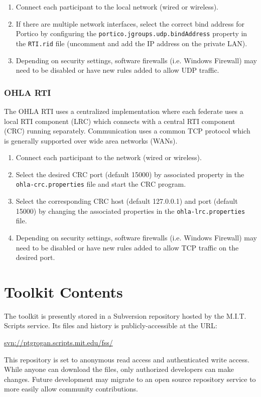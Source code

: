 \documentclass[]{article}
\begin{document}
\begin{enumerate}
\item Connect each participant to the local network (wired or wireless).
\item If there are multiple network interfaces, select the correct bind address for Portico by configuring the \texttt{portico.jgroups.udp.bindAddress} property in the \texttt{RTI.rid} file (uncomment and add the IP address on the private LAN).
\item Depending on security settings, software firewalls (i.e. Windows Firewall) may need to be disabled or have new rules added to allow UDP traffic.
\end{enumerate}

\subsubsection{OHLA RTI}

The OHLA RTI uses a centralized implementation where each federate uses a local RTI component (LRC) which connects with a central RTI component (CRC) running separately. Communication uses a common TCP protocol which is generally supported over wide area networks (WANs). 

\begin{enumerate}
\item Connect each participant to the network (wired or wireless).
\item Select the desired CRC port (default 15000) by associated property in the \texttt{ohla-crc.properties} file and start the CRC program.
\item Select the corresponding CRC host (default 127.0.0.1) and port (default 15000) by changing the associated properties in the \texttt{ohla-lrc.properties} file.
\item Depending on security settings, software firewalls (i.e. Windows Firewall) may need to be disabled or have new rules added to allow TCP traffic on the desired port.
\end{enumerate}

\section{Toolkit Contents}

The toolkit is presently stored in a Subversion repository hosted by the M.I.T. Scripts service. Its files and history is publicly-accessible at the URL:
\begin{center}
\url{svn://ptgrogan.scripts.mit.edu/fss/}
\end{center}
This repository is set to anonymous read access and authenticated write access. While anyone can download the files, only authorized developers can make changes. Future development may migrate to an open source repository service to more easily allow community contributions.
\end{document}
